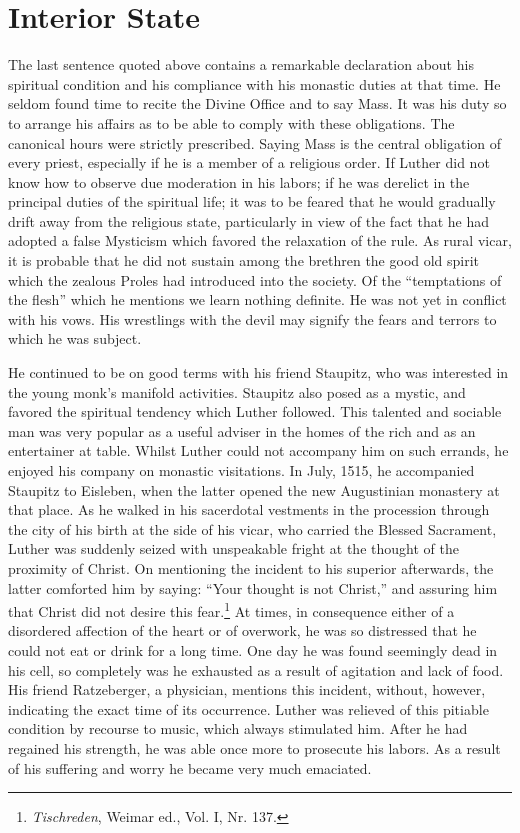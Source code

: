 \section{Interior State}

The last sentence quoted above contains a remarkable declaration
about his spiritual condition and his compliance with his monastic
duties at that time. He seldom found time to recite the Divine Office
and to say Mass. It was his duty so to arrange his affairs as to
be able to comply with these obligations. The canonical hours were
strictly prescribed. Saying Mass is the central obligation of every
priest, especially if he is a member of a religious order. If Luther did not
know how to observe due moderation in his labors; if he was derelict
in the principal duties of the spiritual life; it was to be feared that
he would gradually drift away from the religious state, particularly
in view of the fact that he had adopted a false Mysticism which favored
the relaxation of the rule. As rural vicar, it is probable that he
did not sustain among the brethren the good old spirit which the
zealous Proles had introduced into the society. Of the “temptations
of the flesh” which he mentions we learn nothing definite. He was
not yet in conflict with his vows. His wrestlings with the devil may
signify the fears and terrors to which he was subject.

He continued to be on good terms with his friend Staupitz, who
was interested in the young monk’s manifold activities. Staupitz also
posed as a mystic, and favored the spiritual tendency which Luther
followed. This talented and sociable man was very popular as a useful
adviser in the homes of the rich and as an entertainer at table.
Whilst Luther could not accompany him on such errands, he enjoyed
his company on monastic visitations. In July, 1515, he accompanied
Staupitz to Eisleben, when the latter opened the new
Augustinian monastery at that place. As he walked in his sacerdotal
vestments in the procession through the city of his birth at the side
of his vicar, who carried the Blessed Sacrament, Luther was suddenly
seized with unspeakable fright at the thought of the proximity of
Christ. On mentioning the incident to his superior afterwards, the
latter comforted him by saying: “Your thought is not Christ,” and
assuring him that Christ did not desire this fear.\footnote{\textit{Tischreden}, Weimar ed., Vol. I, Nr. 137.}
At times, in consequence
either of a disordered affection of the heart or of overwork,
he was so distressed that he could not eat or drink for a long
time. One day he was found seemingly dead in his cell, so completely
was he exhausted as a result of agitation and lack of food. His friend
Ratzeberger, a physician, mentions this incident, without, however,
indicating the exact time of its occurrence. Luther was relieved of
this pitiable condition by recourse to music, which always stimulated
him. After he had regained his strength, he was able once more
to prosecute his labors. As a result of his suffering and worry he became
very much emaciated.

